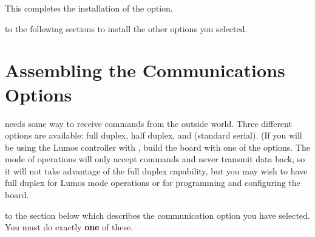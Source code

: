 \documentclass[letterpaper,twoside,onecolumn,openright,final]{memoir}
\begin{document}
This completes the installation of the  option.  

\bigskip

 to the following sections
to install the other options you selected.

\chapter{Assembling the Communications Options}\label{ch:comms}
 needs some way to receive commands from the outside
world.  Three different options are available:  full duplex,  half duplex, and 
(standard serial).  (If you will be using the Lumos controller with , build the
board with one of the  options.  The  mode of operations will only 
accept commands and never transmit data back, so it will not take advantage
of the full duplex capability, but you may wish to have full duplex for Lumos mode operations
or for programming and configuring the board.

\bigskip

 to the section below which describes the communication option
you have selected.  You must do exactly {\bfseries one} of these.
\end{document}
